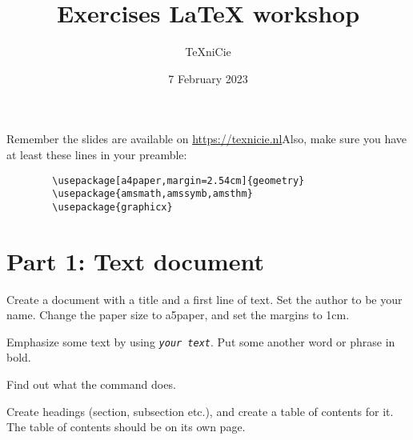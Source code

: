 \documentclass[a4paper]{article}
\title{\vspace{-65pt} Exercises LaTeX workshop}
\author{\TeX niCie%
}
\date{7 February 2023}
\begin{document}
\maketitle


Remember the slides are available on \url{https://texnicie.nl}\quad Also, make sure you have at least these lines in your preamble:
\begin{verbatim}
        \usepackage[a4paper,margin=2.54cm]{geometry}
        \usepackage{amsmath,amssymb,amsthm}
        \usepackage{graphicx}
    \end{verbatim}
\bigskip

\section{Part 1: Text document}

\begin{exercise}
    Create a document with a title and a first line of text. Set the author to
    be your name. Change the paper size to a5paper, and set the margins to 1cm.
\end{exercise}

\begin{exercise}[emphasize]
    Emphasize some text by using \texttt{\emph{your text}}. Put some another word
    or phrase in bold.
    
\end{exercise}

\begin{exercise}[flushright]
    Find out what the \texttt{\flushright} command does.
\end{exercise}

\begin{exercise}[headings]
    Create headings (section, subsection etc.), and create
    a table of contents for it. The table of contents should be on its own page.
\end{exercise}
\end{document}
